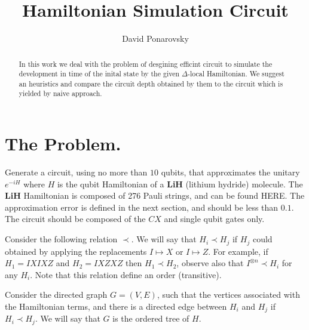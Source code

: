 \documentclass{article}
\newcommand{\commentt}[1]{\textcolor{blue}{ \textbf{[COMMENT]} #1}}
\newcommand{\ctt}[1]{\commentt{#1}}
\newcommand{\PSI}{{\ket{\psi}}}
\begin{document}
\title{Hamiltonian Simulation Circuit}
\author{David Ponarovsky}
\maketitle
\begin{abstract} 
  In this work we deal with the problem of desgining efficint circuit to simulate the development in time of the inital state by the given $\Delta$-local Hamiltonian. We suggest an heuristics and  compare the circuit depth obtained by them to the circuit which is yielded by naive approach.   
\end{abstract}


\section{The Problem.}
Generate a circuit, using no more than \(10\) qubits, that approximates the unitary \(e^{-iH}\) where \(H\) is the qubit Hamiltonian of a \textbf{LiH} (lithium hydride) molecule. The \textbf{LiH} Hamiltonian is composed of 276 Pauli strings, and can be found HERE. The approximation error is defined in the next section, and should be less than \(0.1\). The circuit should be composed of the \(CX\) and single qubit gates only.

\begin{definition}
  Consider the following relation $\prec$. We will say that $H_{i} \prec H_{j}$ if $H_{j}$ could obtained by applying the replacements $I \mapsto X  $ or $ I \mapsto Z$. For example, if $H_{1} = IXIXZ$ and $H_{2}=IXZXZ$ then $H_{1}\prec H_{2}$, observe also that $I^{\otimes n} \prec H_{i}$ for any $H_{i}$. Note that this relation define an order (transitive). 
\end{definition}
\begin{definition} 
  Consider the directed graph $G=\left( V,E \right)$, such that the vertices associated with the Hamiltonian terms, and there is a directed edge between $H_{i}$ and $H_{j}$ if $H_{i} \prec H_{j}$. We will say that $G$ is the ordered tree of $H$. 
\end{definition}
\end{document}
